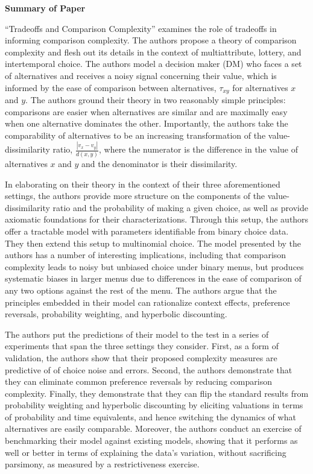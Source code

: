 \documentclass[12pt]{article}
\author{Dylan Baker}
\begin{document}
\textbf{Summary of Paper}

``Tradeoffs and Comparison Complexity''
examines the role of tradeoffs 
in informing comparison complexity.
The authors propose
a theory of comparison complexity 
and flesh out its details
in the context of 
multiattribute, lottery, and intertemporal choice.
The authors model 
a decision maker (DM) who faces a set of alternatives 
and receives a noisy signal concerning their 
value, which is informed by the ease of comparison
between alternatives, $\tau_{xy}$ for 
alternatives $x$ and $y$.
The authors ground their theory in two 
reasonably simple principles: 
comparisons are easier when alternatives are similar
and are maximally easy when one alternative dominates the other.
Importantly, the authors take 
the comparability of alternatives to be 
an increasing transformation of the 
value-dissimilarity ratio,
$\frac{\left|v_x-v_y\right|}{d(x, y)}$, where 
the numerator is the difference in the 
value of alternatives $x$ and $y$
and the denominator is their dissimilarity.

In elaborating on their theory in the context of 
their three aforementioned settings,
the authors provide more structure on 
the components of the value-dissimilarity ratio 
and the probability 
of making a given choice, as well as provide 
axiomatic foundations for their characterizations.
Through this setup, the authors offer 
a tractable model with parameters 
identifiable from binary choice data.
They then extend this setup to 
multinomial choice. The model 
presented by the authors has a number of 
interesting implications, including
that comparison complexity leads to noisy but 
unbiased choice under binary menus, but 
produces systematic biases in larger menus due to 
differences in the ease of comparison 
of any two options against the rest of the menu.
The authors argue that the principles 
embedded in their model can rationalize context effects, 
preference reversals, probability weighting, 
and hyperbolic discounting.

The authors put the predictions of their model to the 
test in a series of experiments that span the 
three settings they consider.
First, as a form of validation, 
the authors show that their proposed 
complexity measures are predictive of 
of choice noise and errors.
Second, the authors demonstrate that they can 
eliminate common preference reversals
by reducing comparison complexity.
Finally, they demonstrate that they can 
flip 
the standard results from 
probability weighting and hyperbolic discounting
by eliciting valuations in terms of 
probability and time equivalents,
and hence switching the dynamics of 
what alternatives are easily comparable.
Moreover, the authors conduct an exercise
of benchmarking their model 
against existing models,
showing that it performs as well or better in 
terms of explaining the data's variation, 
without sacrificing parsimony, as measured 
by a restrictiveness exercise.
\end{document}
